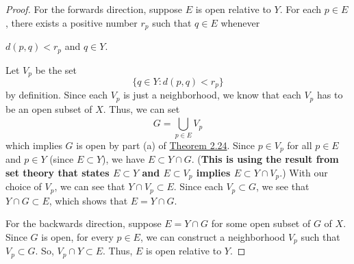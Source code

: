 \documentclass[11pt,a4paper]{book}
\begin{document}
\begin{proof}
    For the forwards direction, suppose \( E  \) is open relative to \( Y  \). For each \( p \in E  \), there exists a positive number \( {r}_{p} \) such that \( q \in E  \) whenever
    \begin{center}
         \( d(p,q) < {r}_{p} \) and \( q \in Y \).
    \end{center}
    Let \( {V}_{p} \) be the set
    \[  \{ q \in Y : d(p,q) < {r}_{p} \}  \]
    by definition. Since each \( {V}_{p} \) is just a neighborhood, we know that each \( {V}_{p} \) has to be an open subset of \( X  \). Thus, we can set
    \[  G = \bigcup_{ p \in E  }^{  }  {V}_{p} \]
    which implies \( G  \) is open by part (a) of {\hyperref[Theorem 2.24]{Theorem 2.24}}. Since \( p \in {V}_{p} \) for all \( p \in E  \) and \( p \in Y  \) (since \( E \subset Y  \)), we have \( E \subset Y \cap G   \). (\textbf{This is using the result from set theory that states \( E \subset Y  \) and \( E \subset {V}_{p} \) implies \( E \subset Y \cap {V}_{p} \)}.)
    With our choice of \( {V}_{p} \), we can see that \( Y \cap {V}_{p} \subset E  \). Since each \( {V}_{p} \subset G   \), we see that \( Y \cap G \subset E  \), which shows that \( E = Y \cap G  \).

    For the backwards direction, suppose \(  E = Y \cap G  \) for some open subset of \( G  \) of \( X  \). Since \( G  \) is open, for every \( p \in E  \), we can construct a neighborhood \( {V}_{p} \) such that \( {V}_{p} \subset G   \). So, \( {V}_{p} \cap Y \subset E   \). Thus, \( E  \) is open relative to \( Y  \).  
\end{proof}
\end{document}
